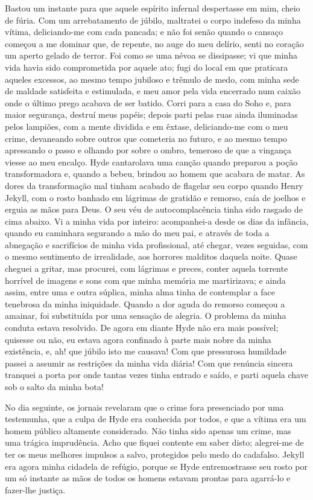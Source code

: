 Bastou um instante para que aquele espírito infernal despertasse em mim,
cheio de fúria.  Com um arrebatamento de júbilo, maltratei o corpo
indefeso da minha vítima, deliciando-me com cada pancada; e não foi
senão quando o cansaço começou a me dominar que, de repente, no auge do
meu delírio, senti no coração um aperto gelado de terror.  Foi como se
uma névoa se dissipasse; vi que minha vida havia sido comprometida por
aquele ato; fugi do local em que praticara aqueles excessos, ao mesmo
tempo jubiloso e trêmulo de medo, com minha sede de maldade satisfeita
e estimulada, e meu amor pela vida encerrado num caixão onde o último
prego acabava de ser batido.  Corri para a casa do Soho e, para maior
segurança, destruí meus papéis; depois parti pelas ruas ainda
iluminadas pelos lampiões, com a mente dividida e em êxtase,
deliciando-me com o meu crime, devaneando sobre outros que cometeria no
futuro, e ao mesmo tempo apressando o passo e olhando por sobre o
ombro, temeroso de que a vingança viesse ao meu encalço.  Hyde
cantarolava uma canção quando preparou a poção transformadora e, quando
a bebeu, brindou ao homem que acabara de matar.  As dores da
transformação mal tinham acabado de flagelar seu corpo quando Henry
Jekyll, com o rosto banhado em lágrimas de gratidão e remorso, caía de
joelhos e erguia as mãos para Deus.  O seu véu de autocomplacência
tinha sido rasgado de cima abaixo.  Vi a minha vida por inteiro:
acompanhei-a desde os dias da infância, quando eu caminhara segurando a
mão do meu pai, e através de toda a abnegação e sacrifícios de minha
vida profissional, até chegar, vezes seguidas, com o mesmo sentimento
de irrealidade, aos horrores malditos daquela noite.  Quase cheguei a
gritar, mas procurei, com lágrimas e preces, conter aquela torrente
horrível de imagens e sons com que minha memória me martirizava; e
ainda assim, entre uma e outra súplica, minha alma tinha de contemplar
a face tenebrosa da minha iniquidade. Quando a dor aguda do remorso
começou a amainar, foi substituída por uma sensação de alegria.  O
problema da minha conduta estava resolvido.  De agora em diante Hyde
não era mais possível; quisesse ou não, eu estava agora confinado à
parte mais nobre da minha existência, e, ah! que júbilo isto me
causava!  Com que pressurosa humildade passei a assumir as restrições
da minha vida diária!  Com que renúncia sincera tranquei a porta por
onde tantas vezes tinha entrado e saído, e parti aquela chave sob o
salto da minha bota!

No dia seguinte, os jornais revelaram que o crime fora presenciado por
uma testemunha, que a culpa de Hyde era conhecida por todos, e que a
vítima era um homem público altamente considerado.  Não tinha sido
apenas um crime, mas uma trágica imprudência.  Acho que fiquei contente
em saber disto; alegrei-me de ter os meus melhores impulsos a salvo,
protegidos pelo medo do cadafalso.  Jekyll era agora minha cidadela de
refúgio, porque se Hyde entremostrasse seu rosto por um só instante as
mãos de todos os homens estavam prontas para agarrá-lo e fazer-lhe
justiça. 

